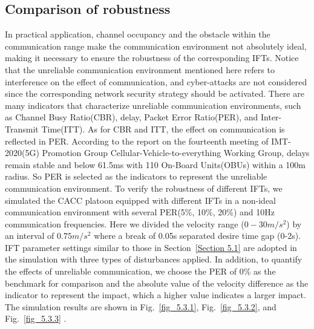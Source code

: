 \documentclass[journal]{IEEEtran}
\begin{document}
\subsection{Comparison of robustness}
\label{Section 5.3}
In practical application, channel occupancy and the obstacle within the communication range make the communication environment not absolutely ideal, making it necessary to ensure the robustness of the corresponding IFTs. Notice that the unreliable communication environment mentioned here refers to interference on the effect of communication, and cyber-attacks are not considered since the corresponding network security strategy should be activated. There are many indicators that characterize unreliable communication environments, such as Channel Busy Ratio(CBR), delay, Packet Error Ratio(PER), and Inter-Transmit Time(ITT). As for CBR and ITT, the effect on communication is reflected in PER. According to the report on the fourteenth meeting of IMT-2020(5G) Promotion Group Cellular-Vehicle-to-everything Working Group, delays remain stable and below 61.5ms with 110 On-Board Units(OBUs) within a 100m radius. So PER is selected as the indicators to represent the unreliable communication environment. To verify the robustness of different IFTs, we simulated the CACC platoon equipped with different IFTs in a non-ideal communication environment with several PER(5\%, 10\%, 20\%) and 10Hz communication frequencies. Here we divided the velocity range ($0-30 m/s^2$) by an interval of $0.75 m/s^2$ where a break of 0.05s separated desire time gap (0-2s). IFT parameter settings similar to those in Section~\ref{Section 5.1} are adopted in the simulation with three types of disturbances applied. In addition, to quantify the effects of unreliable communication, we choose the PER of 0\% as the benchmark for comparison and the absolute value of the velocity difference as the indicator to represent the impact, which a higher value indicates a larger impact. The simulation results are shown in Fig.~\ref{fig_5.3.1}, Fig.~\ref{fig_5.3.2}, and Fig.~\ref{fig_5.3.3} .
\end{document}
